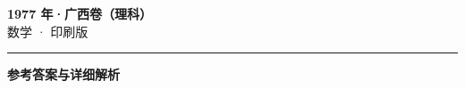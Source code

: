 \documentclass[zihao=5, a4paper]{ctexart}
\begin{document}
\begin{center}
  {\Large\bfseries 1977 年·广西卷（理科）}\\[4pt]
  {\large 数学 · 印刷版}
\end{center}
\medskip
{}

\par\bigskip\hrule\bigskip
{}
\begin{center}{\large\bfseries 参考答案与详细解析}\end{center}
\smallskip

\end{document}
